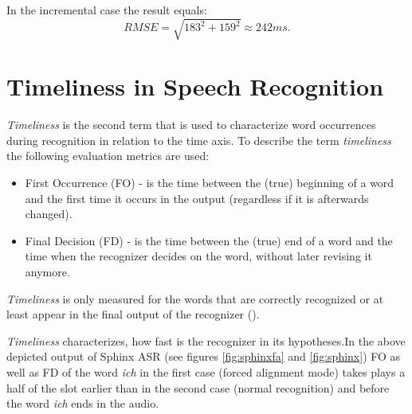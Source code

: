 In the incremental case the result equals:
\begin{equation} RMSE=\sqrt
{183^2+159^2} \approx 242 ms. 
\end{equation}



\section {Timeliness in Speech Recognition} 
\textit {Timeliness} is the second term that is used to characterize word
occurrences during recognition in relation to the time axis. 
To describe the term \textit {timeliness} the following evaluation metrics are
used:
\begin{itemize}
  \item First Occurrence (FO) - is the time between the (true) beginning of a
  word and the first time it occurs in the output (regardless if it is afterwards changed).
\item Final Decision (FD) - is the time between the (true) end of a word and the
time when the recognizer decides on the word, without later revising it anymore.
\end{itemize}

\textit {Timeliness} is only measured for the words that are correctly
recognized or at least appear in the final output of the recognizer  (\parencite
{Baumann2016}).

\textit {Timeliness} characterizes, how fast is the recognizer in its
hypotheses.In the above depicted output of Sphinx ASR (see figures \ref {fig:sphinxfa} and \ref {fig:sphinx}) FO as well as FD of 
the word \textit {ich}  in the first
case (forced alignment mode) takes plays a half of the slot earlier than in the second case (normal
recognition) and before the word \textit {ich} ends in the audio. 

 





 

 